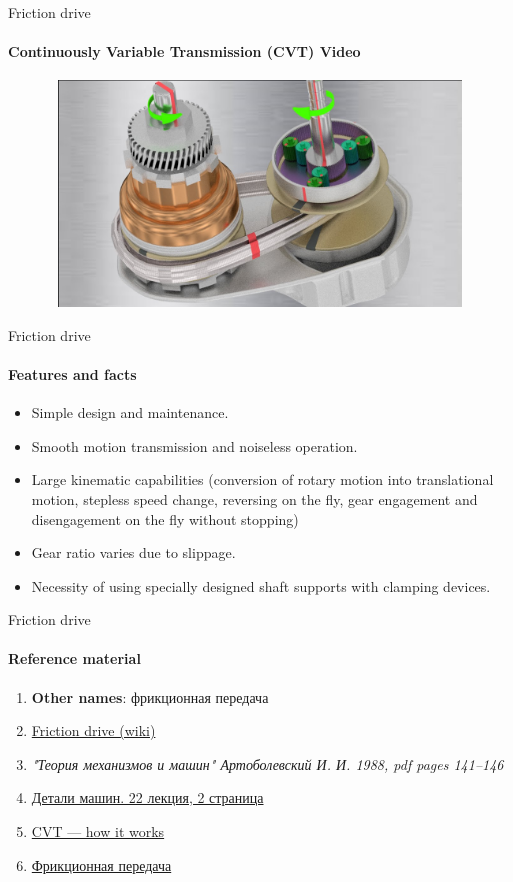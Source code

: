 \documentclass[aspectratio=169]{beamer}
\begin{document}
\begin{frame}[t]{Friction drive}
    \framesubtitle{Continuously Variable Transmission (CVT) Video}
    \vspace{-0.6cm}
    \begin{figure}[H]
        \href{https://youtu.be/PEq5_b4LWNY}{
            \centering\includegraphics[height=6cm,width=1\textwidth,keepaspectratio]{friction_variator_preview.jpg}}
        \label{fig:friction_variator_preview.jpg}
    \end{figure}
\end{frame}

\begin{frame}[t]{Friction drive}
    \framesubtitle{Features and facts}
    \begin{itemize}
        \item Simple design and maintenance.
        \item Smooth motion transmission and noiseless operation.
        \item Large kinematic capabilities (conversion of rotary motion into translational motion, stepless speed change, reversing on the fly, gear engagement and disengagement on the fly without stopping)
        \item Gear ratio varies due to slippage.
        \item Necessity of using specially designed shaft supports with clamping devices.
    \end{itemize}
\end{frame}

\begin{frame}[t]{Friction drive}
    \framesubtitle{Reference material}
    \begin{enumerate}
        \item \textbf{Other names}: фрикционная передача
        \item \href{https://en.m.wikipedia.org/wiki/Friction_drive}{Friction drive (wiki)}
        \item \textit{"Теория механизмов и машин" Артоболевский И. И. 1988, pdf pages 141--146 }
        \item \href{https://studfile.net/preview/2156467/page:2/}{Детали машин. 22 лекция, 2 страница}
        \item \href{https://www.youtube.com/watch?v=uCEvBGT8twM}{CVT --- how it works}
        \item \href{https://youtu.be/H1Dde7frZx8}{Фрикционная передача}
    \end{enumerate}
\end{frame}
\end{document}
